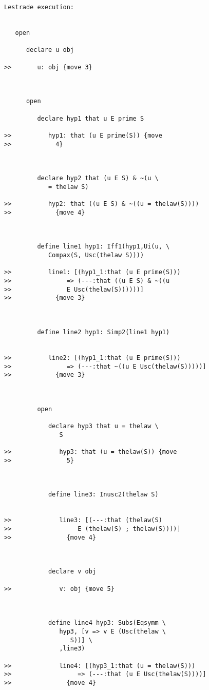 \documentclass[12pt]{article}
\begin{document}
\begin{verbatim}Lestrade execution:


   open

      declare u obj

>>       u: obj {move 3}



      open

         declare hyp1 that u E prime S

>>          hyp1: that (u E prime(S)) {move
>>            4}



         declare hyp2 that (u E S) & ~(u \
            = thelaw S)

>>          hyp2: that ((u E S) & ~((u = thelaw(S))))
>>            {move 4}



         define line1 hyp1: Iff1(hyp1,Ui(u, \
            Compax(S, Usc(thelaw S))))

>>          line1: [(hyp1_1:that (u E prime(S)))
>>               => (---:that ((u E S) & ~((u
>>               E Usc(thelaw(S))))))]
>>            {move 3}



         define line2 hyp1: Simp2(line1 hyp1)


>>          line2: [(hyp1_1:that (u E prime(S)))
>>               => (---:that ~((u E Usc(thelaw(S)))))]
>>            {move 3}



         open

            declare hyp3 that u = thelaw \
               S

>>             hyp3: that (u = thelaw(S)) {move
>>               5}



            define line3: Inusc2(thelaw S)


>>             line3: [(---:that (thelaw(S)
>>                  E (thelaw(S) ; thelaw(S))))]
>>               {move 4}



            declare v obj

>>             v: obj {move 5}



            define line4 hyp3: Subs(Eqsymm \
               hyp3, [v => v E (Usc(thelaw \
                  S))] \
               ,line3)

>>             line4: [(hyp3_1:that (u = thelaw(S)))
>>                  => (---:that (u E Usc(thelaw(S))))]
>>               {move 4}




\end{verbatim}
\end{document}

